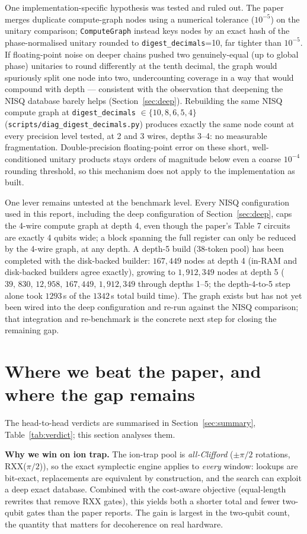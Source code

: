 \documentclass[11pt,a4paper]{article}
\begin{document}
One implementation-specific hypothesis was tested and ruled out. The paper
merges duplicate compute-graph nodes using a numerical tolerance
($10^{-5}$) on the unitary comparison; \texttt{ComputeGraph} instead keys
nodes by an exact hash of the phase-normalised unitary rounded to
\texttt{digest\_decimals}=10, far tighter than $10^{-5}$. If floating-point
noise on deeper chains pushed two genuinely-equal (up to global phase)
unitaries to round differently at the tenth decimal, the graph would
spuriously split one node into two, undercounting coverage in a way that
would compound with depth --- consistent with the observation that
deepening the NISQ database barely helps (Section~\ref{sec:deep}). Rebuilding
the same NISQ compute graph at \texttt{digest\_decimals} $\in\{10,8,6,5,4\}$
(\texttt{scripts/diag\_digest\_decimals.py}) produces exactly the same node
count at every precision level tested, at 2 and 3 wires, depths 3--4: no
measurable fragmentation. Double-precision floating-point error on these
short, well-conditioned unitary products stays orders of magnitude below
even a coarse $10^{-4}$ rounding threshold, so this mechanism does not apply
to the implementation as built.

One lever remains untested at the benchmark level. Every NISQ configuration
used in this report, including the deep configuration of
Section~\ref{sec:deep}, caps the 4-wire compute graph at depth 4, even
though the paper's Table 7 circuits are exactly 4 qubits wide; a block
spanning the full register can only be reduced by the 4-wire graph, at any
depth. A depth-5 build (38-token pool) has been completed with the
disk-backed builder: $167{,}449$ nodes at depth 4 (in-RAM and disk-backed
builders agree exactly), growing to $1{,}912{,}349$ nodes at depth 5
($39,\,830,\,12{,}958,\,167{,}449,\,1{,}912{,}349$ through depths 1--5; the
depth-4-to-5 step alone took $1293$\,s of the $1342$\,s total build time).
The graph exists but has not yet been wired into the deep configuration and
re-run against the NISQ comparison; that integration and re-benchmark is
the concrete next step for closing the remaining gap.

\section{Where we beat the paper, and where the gap remains}
\label{sec:summary2}
The head-to-head verdicts are summarised in Section~\ref{sec:summary},
Table~\ref{tab:verdict}; this section analyses them.

\noindent\textbf{Why we win on ion trap.} The ion-trap pool is
\emph{all-Clifford} ($\pm\pi/2$ rotations, RXX($\pi/2$)), so the exact
symplectic engine applies to \emph{every} window: lookups are bit-exact,
replacements are equivalent by construction, and the search can exploit a deep
exact database. Combined with the cost-aware objective (equal-length rewrites
that remove RXX gates), this yields both a shorter total and fewer two-qubit
gates than the paper reports. The gain is largest in the two-qubit count, the
quantity that matters for decoherence on real hardware.
\end{document}
